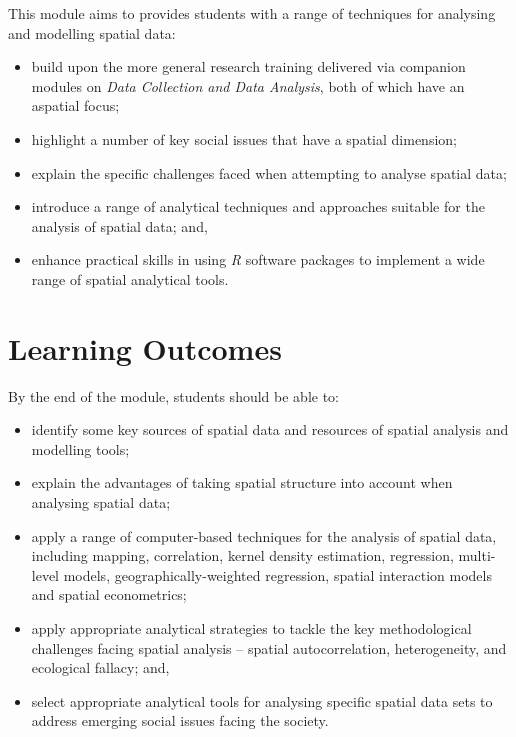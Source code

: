 \documentclass[
  letterpaper,
  krantz2]{style/krantz}
\providecommand{\tightlist}{%
  \setlength{\itemsep}{0pt}\setlength{\parskip}{0pt}}\usepackage{longtable,booktabs,array}
\begin{document}
This module aims to provides students with a range of techniques for
analysing and modelling spatial data:

\begin{itemize}
\tightlist
\item
  build upon the more general research training delivered via companion
  modules on \emph{Data Collection and Data Analysis}, both of which
  have an aspatial focus;
\item
  highlight a number of key social issues that have a spatial dimension;
\item
  explain the specific challenges faced when attempting to analyse
  spatial data;
\item
  introduce a range of analytical techniques and approaches suitable for
  the analysis of spatial data; and,
\item
  enhance practical skills in using \emph{R} software packages to
  implement a wide range of spatial analytical tools.
\end{itemize}

\hypertarget{learning-outcomes}{%
\section{Learning Outcomes}\label{learning-outcomes}}

By the end of the module, students should be able to:

\begin{itemize}
\tightlist
\item
  identify some key sources of spatial data and resources of spatial
  analysis and modelling tools;
\item
  explain the advantages of taking spatial structure into account when
  analysing spatial data;
\item
  apply a range of computer-based techniques for the analysis of spatial
  data, including mapping, correlation, kernel density estimation,
  regression, multi-level models, geographically-weighted regression,
  spatial interaction models and spatial econometrics;
\item
  apply appropriate analytical strategies to tackle the key
  methodological challenges facing spatial analysis -- spatial
  autocorrelation, heterogeneity, and ecological fallacy; and,
\item
  select appropriate analytical tools for analysing specific spatial
  data sets to address emerging social issues facing the society.
\end{itemize}
\end{document}
